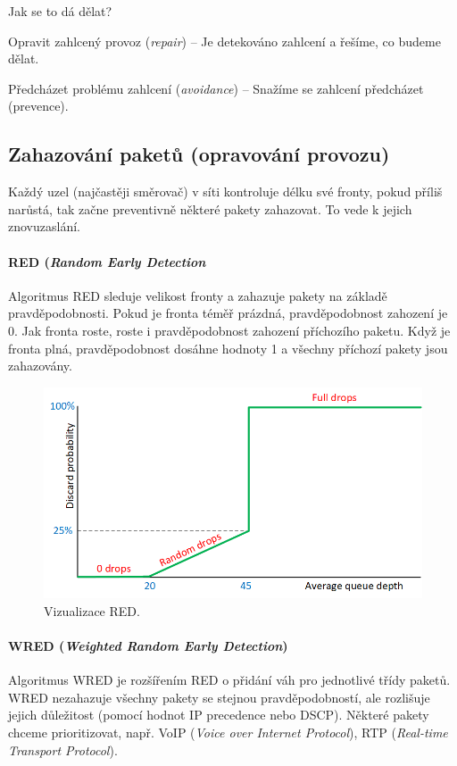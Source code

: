 \noindent Jak se to dá dělat? \begin{compactitem}
    \item Opravit zahlcený provoz (\textit{repair}) -- Je detekováno zahlcení a řešíme, co budeme dělat.
    \item Předcházet problému zahlcení (\textit{avoidance}) -- Snažíme se zahlcení předcházet (prevence).
\end{compactitem}

\subsection{Zahazování paketů (opravování provozu)}

Každý uzel (najčastěji směrovač) v síti kontroluje délku své fronty, pokud příliš narůstá, tak začne preventivně některé pakety zahazovat. To vede k jejich znovuzaslání.

\paragraph*{RED (\textit{Random Early Detection}} Algoritmus RED sleduje velikost fronty a zahazuje pakety na základě pravděpodobnosti. Pokud je fronta téměř prázdná, pravděpodobnost zahození je 0. Jak fronta roste, roste i pravděpodobnost zahození příchozího paketu. Když je fronta plná, pravděpodobnost dosáhne hodnoty 1 a všechny příchozí pakety jsou zahazovány.

\begin{figure}[H]
    \centering
    \includegraphics[width=0.9\linewidth]{red.png}
    \caption{Vizualizace RED.}
\end{figure}

\paragraph*{WRED (\textit{Weighted Random Early Detection})} Algoritmus WRED je rozšířením RED o přidání váh pro jednotlivé třídy paketů. WRED nezahazuje všechny pakety se stejnou pravděpodobností, ale rozlišuje jejich důležitost (pomocí hodnot IP precedence nebo DSCP). Některé pakety chceme prioritizovat, např. VoIP (\textit{Voice over Internet Protocol}), RTP (\textit{Real-time Transport Protocol}).

